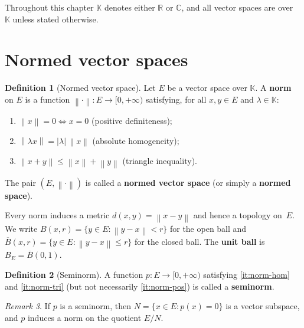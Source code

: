 \documentclass[a4paper,12pt]{book}
\newcommand{\R}{\mathbb{R}}
\newcommand{\C}{\mathbb{C}}
\newcommand{\K}{\mathbb{K}}
\newcommand{\norm}[1]{\left\| #1 \right\|}
\newcommand{\abs}[1]{\left| #1 \right|}
\theoremstyle{definition}
\newtheorem{definition}{Definition}[chapter]
\theoremstyle{plain}
\theoremstyle{remark}
\newtheorem{remark}[definition]{Remark}
\begin{document}
Throughout this chapter $\K$ denotes either $\R$ or $\C$, and all vector
spaces are over~$\K$ unless stated otherwise.

\section{Normed vector spaces}
\label{sec:normed-spaces}

\begin{definition}[Normed vector space]
\label{def:norm}
Let $E$ be a vector space over $\K$.  A \textbf{norm} on $E$ is a
function $\norm{\cdot} : E \to [0,+\infty)$ satisfying, for all
$x,y\in E$ and $\lambda\in\K$:
\begin{enumerate}[label=\textup{(N\arabic*)}]
  \item \label{it:norm-pos} $\norm{x} = 0 \iff x = 0$
        \hfill(positive definiteness);
  \item \label{it:norm-hom} $\norm{\lambda x} = \abs{\lambda}\,\norm{x}$
        \hfill(absolute homogeneity);
  \item \label{it:norm-tri} $\norm{x+y} \le \norm{x}+\norm{y}$
        \hfill(triangle inequality).
\end{enumerate}
The pair $(E,\norm{\cdot})$ is called a \textbf{normed vector space}
(or simply a \textbf{normed space}).
\end{definition}

Every norm induces a metric $d(x,y)=\norm{x-y}$ and hence a
topology on~$E$.  We write $B(x,r)=\{y\in E:\norm{y-x}<r\}$ for the open
ball and $\overline{B}(x,r)=\{y\in E:\norm{y-x}\le r\}$
for the closed ball.  The \textbf{unit ball}
is $B_E = \overline{B}(0,1)$.

\begin{definition}[Seminorm]
\label{def:seminorm}
A function $p : E \to [0,+\infty)$ satisfying \ref{it:norm-hom} and
\ref{it:norm-tri} (but not necessarily \ref{it:norm-pos}) is called a
\textbf{seminorm}.
\end{definition}

\begin{remark}
\label{rem:seminorm-kernel}
If $p$ is a seminorm, then $N = \{x\in E : p(x)=0\}$ is a vector subspace,
and $p$ induces a norm on the quotient $E/N$.
\end{remark}
\end{document}
